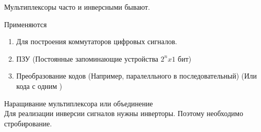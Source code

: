 Мультиплексоры часто и инверсными бывают.

Применяются\\
\begin{enumerate}
  \item Для построения коммутаторов цифровых сигналов.
  \item ПЗУ (Постоянные запоминающие устройства $ 2^n x 1 $ бит)
  \item Преобразование кодов (Например, паралелльного в последовательный) (Или кода с одним )
\end{enumerate}


Наращивание  мультиплексора или объединение\\
Для реализации инверсии сигналов нужны инверторы. Поэтому необходимо стробирование.







